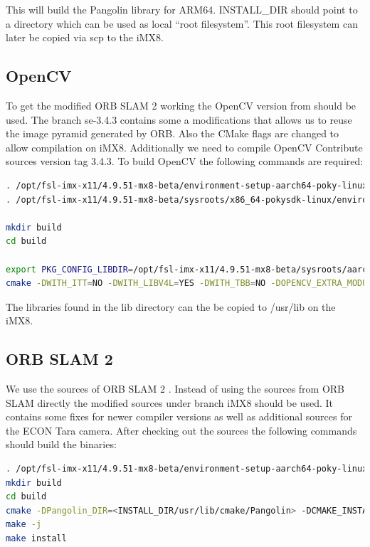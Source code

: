 \documentclass[11pt,a4paper,titlepage,oneside]{report}
\begin{document}
This will build the Pangolin library for ARM64. INSTALL\_DIR should point to a directory which can be used as local ``root filesystem''. This root filesystem can later be copied via scp to the iMX8.

\subsection{OpenCV}\label{sec:opencv}
To get the modified ORB SLAM 2 working the OpenCV version from \cite{opencv_se} should be used. The branch se-3.4.3 contains some a modifications that allows us to reuse the image pyramid generated by ORB. Also the CMake flags are changed to allow compilation on iMX8. Additionally we need to compile OpenCV Contribute \cite{opencv_contrib} sources version tag 3.4.3. To build OpenCV the following commands are required:
\begin{lstlisting}[language=bash]
. /opt/fsl-imx-x11/4.9.51-mx8-beta/environment-setup-aarch64-poky-linux
. /opt/fsl-imx-x11/4.9.51-mx8-beta/sysroots/x86_64-pokysdk-linux/environment-setup.d/cmake.sh

mkdir build
cd build

export PKG_CONFIG_LIBDIR=/opt/fsl-imx-x11/4.9.51-mx8-beta/sysroots/aarch64-poky-linux/usr/lib/pkgconfig/
cmake -DWITH_ITT=NO -DWITH_LIBV4L=YES -DWITH_TBB=NO -DOPENCV_EXTRA_MODULES_PATH=<path to OpenCV contrib> -DCMAKE_BUILD_TYPE=Release ..
\end{lstlisting}

The libraries found in the lib directory can the be copied to /usr/lib on the iMX8.

\subsection{ORB SLAM 2}
We use the sources of ORB SLAM 2 \cite{orbslam2_impl}. Instead of using the sources from ORB SLAM directly the modified sources \cite{orbslam2_se} under branch iMX8 should be used. It contains some fixes for newer compiler versions as well as additional sources for the ECON Tara camera. After checking out the sources the following commands should build the binaries:\\
\begin{lstlisting}[language=bash]
. /opt/fsl-imx-x11/4.9.51-mx8-beta/environment-setup-aarch64-poky-linux
mkdir build
cd build
cmake -DPangolin_DIR=<INSTALL_DIR/usr/lib/cmake/Pangolin> -DCMAKE_INSTALL_PREFIX=<INSTALL_DIR> -DOpenCV_DIR:PATH=<OPENCV_BUILD_DIR> ..
make -j
make install
\end{lstlisting}
\end{document}
